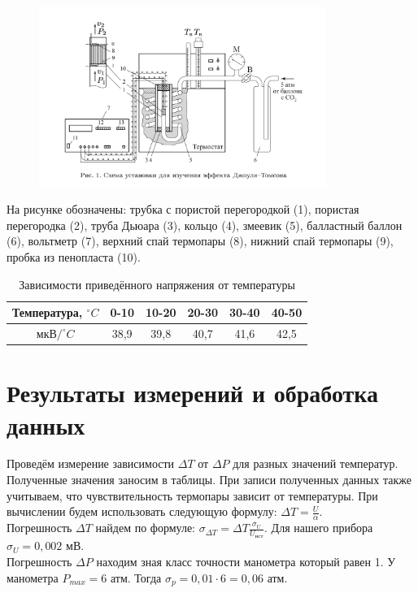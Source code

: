 \documentclass[a4paper,12pt]{article}
\begin{document}
\begin{figure}[H]
    \centering
    \includegraphics[width=0.83\textwidth]{7.png}
\end{figure}
На рисунке обозначены: трубка с пористой перегородкой (1), пористая перегородка (2), труба Дьюара (3), кольцо (4), змеевик (5), балластный баллон (6), вольтметр (7), верхний спай термопары (8), нижний спай термопары (9), пробка из пенопласта (10).

\begin{table}[!ht]
    \centering
    \begin{tabular}{|c|c|c|c|c|c|}
    \hline
    Температура, $^\circ C$ & 0-10 & 10-20 & 20-30 & 30-40 & 40-50 \\ \hline
    мкВ$/^\circ C$ & 38,9 & 39,8 & 40,7 & 41,6 & 42,5 \\ \hline
    \end{tabular}
    \caption {Зависимости приведённого напряжения от температуры}
\end{table}


\section{Результаты измерений и обработка данных}



Проведём измерение зависимости $ \Delta T $ от $ \Delta P $ для разных значений температур. Полученные значения заносим в таблицы. При записи полученных данных также учитываем, что чувствительность термопары зависит от температуры. При вычислении будем использовать следующую формулу: $ \Delta T = \frac{U}{\alpha}$.
\\ Погрешность $ \Delta T $ найдем по формуле: $ \sigma_{\Delta T} = \Delta T \frac{\sigma_U}{U_{ист}}$. Для нашего прибора $\sigma_U = 0,002$ мВ.
\\ Погрешность $ \Delta P$ находим зная класс точности манометра который равен 1. У манометра $P_{max} = 6 \text{ атм}$. Тогда $\sigma_p = 0,01 \cdot 6 = 0,06 \text{ атм}$.
\end{document}
